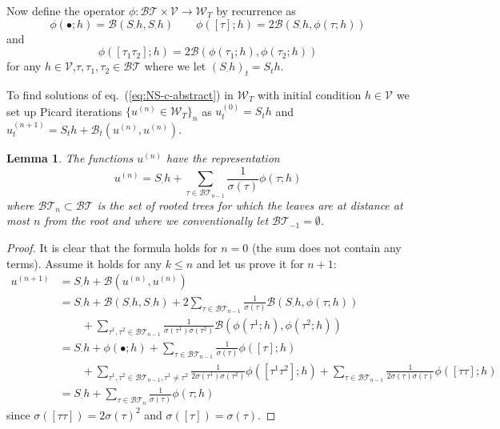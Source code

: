 \documentclass[a4paper,12pt,reqno]{amsart}
\newcommand{\1}{{\bf 1}}
\newtheorem{lemma}[theorem]{Lemma}
\newcommand{\VV}{\mathcal{V}}
\newcommand{\WW}{\mathcal{W}}
\newcommand{\BT}{\mathcal{BT}}
\newcommand{\troot}{\bullet}
\begin{document}
Now define the operator $\phi : \BT \times \VV \to \WW_T$ by recurrence
as
\begin{equation}
  \label{eq:3}
\phi(\troot;h) = \mathcal{B}(S_{\cdot} h,S_{\cdot }h)
\qquad
\phi([\tau];h) = 2 \mathcal{B}(S_{\cdot} h,\phi(\tau;h))
\end{equation}
and
\begin{equation}
  \label{eq:3c}
\phi([\tau_1 \tau_2];h) = 2 \mathcal{B}(\phi(\tau_1;h),\phi(\tau_2;h))
\end{equation}
for any $h\in \VV$,$\tau,\tau_1,\tau_2 \in \BT$ where we let $(S_{\cdot} h)_t = S_t h$.
 
To find solutions of eq.~(\ref{eq:NS-c-abstract}) in $\WW_T$ with initial
condition $h \in \VV$ we set up Picard iterations $\{u^{(n)} \in \WW_T \}_n$ as $u^{(0)}_t =
S_t h$ and
$
u^{(n+1)}_t = S_t h + \mathcal{B}_t(u^{(n)},u^{(n)})
$.


\begin{lemma}
The functions $u^{(n)}$ have the representation
\begin{equation}
  \label{eq:rep-finite}
u^{(n)} = S_{\cdot} h + \sum_{\tau \in \BT_{n-1}} \frac{1}{\sigma(\tau)} \phi(\tau;h)  
\end{equation}
where $\BT_n \subset \BT$ is the set of rooted trees for which the leaves
are at distance at most $n$ from the root and where we conventionally let $\BT_{-1} =
\emptyset$. 
\end{lemma}
\begin{proof}
It is clear that the formula holds for $n = 0$ (the sum does not
contain any terms). Assume it holds for any $k \le n$ and let us prove
it for $n+1$:
\begin{equation*}
  \begin{split}
u^{(n+1)} & = S_\cdot h +  \mathcal{B}(u^{(n)},u^{(n)})
  \\ & = S_\cdot h + \mathcal{B}(S_\cdot h, S_\cdot h) +  2
  \sum_{\tau \in \BT_{n-1}} \frac{1}{\sigma(\tau)} \mathcal{B}(S_\cdot h,\phi(\tau;h)) 
\\ & \qquad 
+
  \sum_{\tau^1,\tau^2 \in \BT_{n-1}}
  \frac{1}{\sigma(\tau^1)\sigma(\tau^2)} \mathcal{B}(\phi(\tau^1;h),\phi(\tau^2;h))
  \\ & = S_\cdot h +  \phi(\troot;h)
  +  
  \sum_{\tau \in \BT_{n-1}} \frac{1}{\sigma(\tau)} \phi([\tau];h)
\\ & \qquad
 +
  \sum_{\tau^1,\tau^2 \in \BT_{n-1}, \tau^1 \neq \tau^2} 
  \frac{1}{2\sigma(\tau^1)\sigma(\tau^2)} \phi([\tau^1 \tau^2];h)
+   \sum_{\tau \in \BT_{n-1}}
 \frac{1}{2 \sigma(\tau) \sigma(\tau)}
  \phi([\tau \tau];h)
  \\ & = S_\cdot h + \sum_{\tau \in \BT_{n}} \frac{1}{\sigma(\tau)} \phi(\tau;h)
  \end{split}
\end{equation*}
since $\sigma([\tau \tau]) = 2 \sigma(\tau)^2$ and $\sigma([\tau]) =
\sigma(\tau)$.    
\end{proof}
\end{document}
